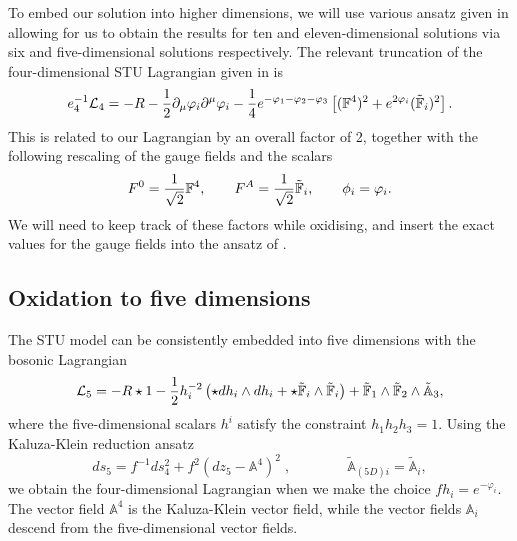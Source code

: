 To embed our solution into higher dimensions, we will use various ansatz given in \cite{Chow:2014cca} allowing for us to obtain the results for ten and eleven-dimensional solutions via six and five-dimensional solutions respectively. The relevant truncation of the four-dimensional STU Lagrangian given in \cite{Chow:2014cca} is
\begin{equation}
\label{eq:4dchow}
     e_4^{-1} {\cal L}_4 = -R - \frac{1}{2} \partial_\mu \varphi_i \partial^\mu \varphi_i
 - \frac{1}{4} e^{-\varphi_1 - \varphi_2 - \varphi_3} \left[ (\mathbb F^4)^2 + e^{2 \varphi_i } (\tilde{\mathbb F}_i)^2 \right] .
\end{equation}
This is related to our Lagrangian  by an overall factor of 2, together with the following rescaling of the gauge fields and the scalars
\begin{equation*}
    F^0 = \frac{1}{\sqrt{2}} \mathbb F^4, \qquad F^A = \frac{1}{\sqrt{2}} \tilde{\mathbb F}_i, \qquad \phi_i = \varphi_i .
\end{equation*}
We will need to keep track of these factors while oxidising, and insert the exact values for the gauge fields into the ansatz of \cite{Chow:2014cca}.

\subsection{Oxidation to five dimensions}
The STU model can be consistently embedded into five dimensions with the bosonic Lagrangian
\begin{equation}
\label{eq:5dchow}
    {\cal L}_5 = - R \star 1 - \frac{1}{2} h_i^{-2} \left(\star dh_i \wedge dh_i + \star \tilde{\mathbb F}_i \wedge \tilde{\mathbb F}_i \right) + \tilde{\mathbb F}_1 \wedge \tilde{\mathbb F}_2 \wedge \tilde{\mathbb{A}}_3,
\end{equation}
where the five-dimensional scalars $h^i$ satisfy the constraint $h_1 h_2 h_3 = 1$. Using the Kaluza-Klein reduction ansatz
\begin{equation}
\label{eq:5dan}
    ds_5 = f^{-1} ds_4^2 + f^2 (dz_5 - \mathbb{A}^4)^2 \;,\qquad \qquad \tilde{\mathbb{A}}_{(5D)i} = \tilde{\mathbb{A}}_i,
\end{equation}
we obtain the four-dimensional Lagrangian  when we make the choice $f h_i= e^{-\varphi_i}$. The vector field $\mathbb{A}^4$ is the Kaluza-Klein vector field, while the vector fields $\mathbb{A}_i$ descend from the five-dimensional vector fields.

